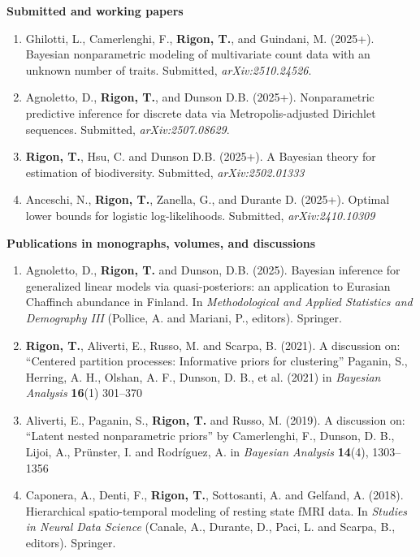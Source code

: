 \documentclass[10pt]{article}
\begin{document}
\textbf{Submitted and working papers}
\begin{enumerate}
\setcounter{enumi}{\value{publications}}

\item Ghilotti, L., Camerlenghi, F., \textbf{Rigon, T.}, and Guindani, M. (2025+). Bayesian nonparametric modeling of multivariate count data with an unknown number of traits. Submitted, \emph{arXiv:2510.24526}.

\item Agnoletto, D., \textbf{Rigon, T.}, and Dunson D.B. (2025+). Nonparametric predictive inference for discrete data via Metropolis-adjusted Dirichlet sequences. Submitted, \emph{arXiv:2507.08629}.

\item \textbf{Rigon, T.}, Hsu, C. and Dunson D.B. (2025+). A Bayesian theory for estimation of biodiversity. Submitted, \emph{arXiv:2502.01333}

\item Anceschi, N., \textbf{Rigon, T.}, Zanella, G., and Durante D. (2025+).  Optimal lower bounds for logistic log-likelihoods. Submitted, \emph{arXiv:2410.10309}

\setcounter{publications}{\value{enumi}}
\end{enumerate}

\textbf{Publications in monographs, volumes, and discussions}

\begin{enumerate}
\setcounter{enumi}{\value{publications}}

\item Agnoletto, D., \textbf{Rigon, T.} and Dunson, D.B. (2025). Bayesian inference for generalized linear models via quasi-posteriors: an application to Eurasian Chaffinch abundance in Finland. In \emph{Methodological and Applied Statistics and Demography III} (Pollice, A. and Mariani, P., editors). Springer. 

\item \textbf{Rigon, T.}, Aliverti, E., Russo, M. and Scarpa, B. (2021). A discussion on: ``Centered partition processes: Informative priors for clustering'' Paganin, S., Herring, A. H., Olshan, A. F., Dunson, D. B., et al. (2021) in \textit{Bayesian Analysis} \textbf{16}(1) 301--370

\item Aliverti, E., Paganin, S., \textbf{Rigon, T.} and Russo, M. (2019). A discussion on: ``Latent nested nonparametric priors'' by Camerlenghi, F., Dunson, D. B., Lijoi, A., Pr\"unster, I. and Rodr\'iguez, A. in \textit{Bayesian Analysis} \textbf{14}(4), 1303--1356

\item Caponera, A., Denti, F., \textbf{Rigon, T.}, Sottosanti, A. and Gelfand, A. (2018). Hierarchical spatio-temporal modeling of resting state fMRI data. In \emph{Studies in Neural Data Science} (Canale, A., Durante, D., Paci, L. and Scarpa, B., editors). Springer.
\setcounter{publications}{\value{enumi}}
\end{enumerate}
\end{document}
